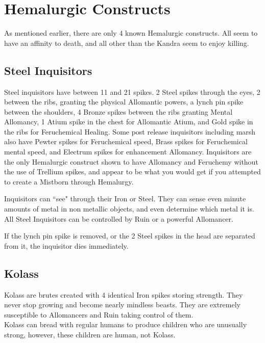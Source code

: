 \documentclass[conference]{IEEEtran}
\begin{document}
\section*{Hemalurgic Constructs}
As mentioned earlier, there are only 4 known Hemalurgic constructs.  All seem to have an affinity to death,\cite{WoA-CH19}\cite{WoF}\cite{HoA-CH69}\cite{SoS-CH21}\cite{TFE-EP}\cite{WoA-CH11} and all other than the Kandra seem to enjoy killing\cite{HoA-CH11}.
\subsection*{Steel Inquisitors}
Steel inquisitors have between 11 and 21 spikes.\cite{TFE-EP}\cite{HoA-CH13}  2 Steel spikes through the eyes,\cite{TFE-CH2} 2 between the ribs, granting the physical Allomantic powers,\cite{HoA-CH5} a lynch pin spike between the shoulders,\cite{TFE-CH38} 4 Bronze spikes between the ribs granting Mental Allomancy,\cite{HoA-CH13} 1 Atium spike in the chest for Allomantic Atium, and Gold spike in the ribs for Feruchemical Healing\cite{HoA-CH72}. Some post release inquisitors including marsh also have Pewter spikes for Feruchemical speed\cite{HoA-CH5}, Brass spikes for Feruchemical mental speed\cite{IN-Ms}, and Electrum spikes for enhancement Allomancy\cite{HoA-CH72}.  Inquisitors are the only Hemalurgic construct shown to have Allomancy and Feruchemy without the use of Trellium spikes, and appear to be what you would get if you attempted to create a Mistborn through Hemalurgy.

Inquisitors can ``see" through their Iron or Steel.\cite{TFE-CH36}  They can sense even minute amounts of metal in non metallic objects, and even determine which metal it is.\cite{HoA-pre}\cite{HoA-CH34}
All Steel Inquisitors can be controlled by Ruin\cite{HoA-CH13} or a powerful Allomancer.\cite{HoA-CH71}

If the lynch pin spike is removed, or the 2 Steel spikes in the head are separated from it, the inquisitor dies immediately.\cite{TFE-CH38}
\subsection*{Kolass}
Kolass are brutes created with 4 identical Iron spikes storing strength.\cite{WoF}  They never stop growing and become nearly mindless beasts.\cite{WoA-CH19}\cite{WoF}
They are extremely susceptible to Allomancers and Ruin taking control of them.\cite{WoF}\cite{HoA}  \\

Kolass can bread with regular humans to produce children who are unusually strong, however, these children are human, not Kolass.\cite{Allo-jack}
\end{document}
